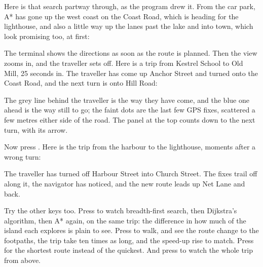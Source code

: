 Here is that search partway through, as the program drew it. From the car
park, A* has gone up the west coast on the Coast Road, which is heading for
the lighthouse, and also a little way up the lanes past the lake and into
town, which look promising too, at first:


The terminal shows the directions as soon as the route is planned. Then the
view zooms in, and the traveller sets off. Here is a trip from Kestrel
School to Old Mill, 25 seconds in. The traveller has come up Anchor Street
and turned onto the Coast Road, and the next turn is onto Hill Road:


The grey line behind the traveller is the way they have come, and the
blue one ahead is the way still to go; the faint dots are the last few GPS
fixes, scattered a few metres either side of the road. The panel at the
top counts down to the next turn, with its arrow.

Now press . Here is the trip from the harbour to the lighthouse,
moments after a wrong turn:


The traveller has turned off Harbour Street into Church Street. The fixes
trail off along it, the navigator has noticed, and the new route leads up
Net Lane and back.

Try the other keys too. Press  to watch breadth-first search, then
Dijkstra's algorithm, then A* again, on the same trip: the difference in
how much of the island each explores is plain to see. Press  to
walk, and see the route change to the footpaths, the trip take ten times
as long, and the speed-up rise to match. Press  for the shortest
route instead of the quickest. And press  to watch the whole trip
from above.
